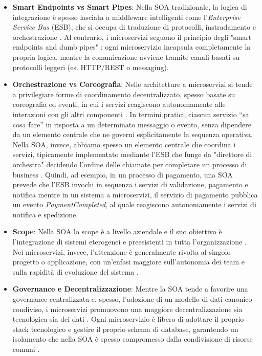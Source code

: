 \begin{itemize}
\item \textbf{Smart Endpoints vs Smart Pipes}: Nella SOA tradizionale, la logica di integrazione è spesso lasciata a middleware intelligenti come l'\textit{Enterprise Service Bus} (ESB), che si occupa di traduzione di protocolli, instradamento e orchestrazione \cite{Cerny2017SOAvsMicroservices}. Al contrario, i microservizi seguono il principio degli "smart endpoints and dumb pipes" \cite{Fowler2014}: ogni microservizio incapsula completamente la propria logica, mentre la comunicazione avviene tramite canali basati su protocolli leggeri (es. HTTP/REST o messaging).
\item \textbf{Orchestrazione vs Coreografia}: Nelle architetture a microservizi si tende a privilegiare forme di coordinamento decentralizzato, spesso basate su coreografia ed eventi, in cui i servizi reagiscono autonomamente alle interazioni con gli altri componenti \cite{Cerny2017SOAvsMicroservices}. In termini pratici, ciascun servizio “sa cosa fare” in risposta a un determinato messaggio o evento, senza dipendere da un elemento centrale che ne governi esplicitamente la sequenza operativa. Nella SOA, invece, abbiamo spesso un elemento centrale che coordina i servizi, tipicamente implementato mediante l'ESB che funge da "direttore di orchestra" decidendo l'ordine delle chiamate per completare un processo di business \cite{Cerny2017SOAvsMicroservices}.
Quindi, ad esempio, in un processo di pagamento, una SOA prevede che l'ESB invochi in sequenza i servizi di validazione, pagamento e notifica mentre in un sistema a microservizi, il servizio di pagamento pubblica un evento \textit{PaymentCompleted}, al quale reagiscono autonomamente i servizi di notifica e spedizione.
\item \textbf{Scope}: Nella SOA lo scope è a livello aziendale e il suo obiettivo è l'integrazione di sistemi eterogenei e preesistenti in tutta l'organizzazione \cite{Cerny2017SOAvsMicroservices}. Nei microservizi, invece, l’attenzione è generalmente rivolta al singolo progetto o applicazione, con un’enfasi maggiore sull’autonomia dei team e sulla rapidità di evoluzione del sistema \cite{Cerny2017SOAvsMicroservices}.
\item \textbf{Governance e Decentralizzazione}: Mentre la SOA tende a favorire una governance centralizzata e, spesso, l’adozione di un modello di dati canonico condiviso, i microservizi promuovono una maggiore decentralizzazione sia tecnologica sia dei dati \cite{Cerny2017SOAvsMicroservices, Fowler2014}. Ogni microservizio è libero di adottare il proprio stack tecnologico e gestire il proprio schema di database, garantendo un isolamento che nella SOA è spesso compromesso dalla condivisione di risorse comuni \cite{Dragoni2017}.

\end{itemize}
